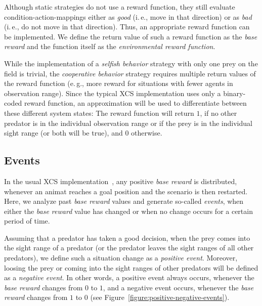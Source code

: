 \documentclass{sig-alternate}
\begin{document}
Although static strategies do not use a reward function, they still evaluate condition-action-mappings either as \emph{good} (i.\,e., move in that direction) or as \emph{bad} (i.\,e., do not move in that direction). Thus, an appropriate reward function can be implemented. We define the return value of such a reward function as the \emph{base reward} and the function itself as the \emph{environmental reward function}.

While the implementation of a \emph{selfish behavior} strategy with only one prey on the field is trivial, the \emph{cooperative behavior} strategy requires multiple return values of the reward function (e.\,g., more reward for situations with fewer agents in observation range). %
Since the typical XCS implementation \cite{BW02} uses only a binary-coded reward function, an approximation will be used to differentiate between these different system states: The reward function will return $1$, if no other predator is in the individual observation range or if the prey is in the individual sight range (or both will be true), and $0$ otherwise. 

\subsection{Events}
\label{subsection:events}

In the usual XCS implementation~\cite{BW02}, any positive \emph{base reward} is distributed, whenever an animat reaches a goal position and the scenario is then restarted. Here, we analyze past \emph{base reward} values and generate so-called \emph{events}, when either the \emph{base reward} value has changed or when no change occurs for a certain period of time.

Assuming that a predator has taken a good decision, when the prey comes into the sight range of a predator (or the predator leaves the sight ranges of all other predators), we define such a situation change as a \emph{positive event}. Moreover, loosing the prey or coming into the sight ranges of other predators will be defined as a \emph{negative event}. In other words, a positive event always occurs, whenever the \emph{base reward} changes from $0$ to $1$, and a negative event occurs, whenever the \emph{base reward} changes from $1$ to $0$ (see Figure~\ref{figure:positive-negative-events}).
\end{document}
